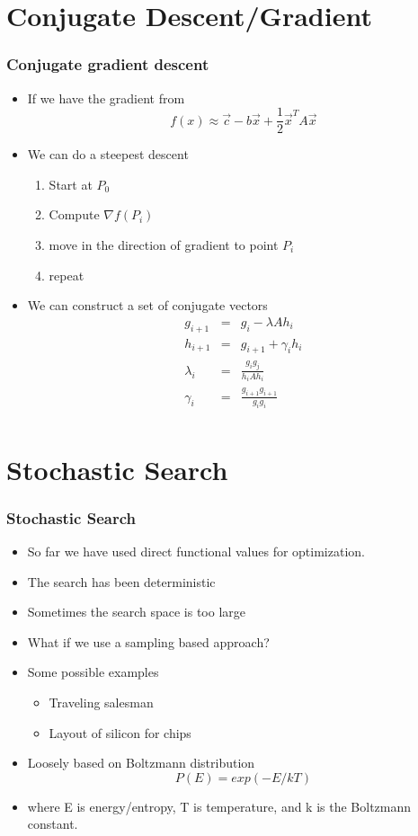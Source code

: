 \documentclass[10pt]{beamer}
\begin{document}
\section{Conjugate Descent/Gradient}
\label{sec:conj-desc}

\begin{frame}
  \frametitle{Conjugate gradient descent}
  \begin{itemize}
  \item If we have the gradient from
    \[
      f(x) \approx \vec{c} - b \vec{x} + \frac{1}{2} \vec{x}^T A \vec{x}
    \]
  \item We can do a steepest descent
    \begin{enumerate}
    \item Start at $P_0$
    \item Compute $\nabla f(P_i)$
    \item move in the direction of gradient to point $P_i$
    \item repeat
    \end{enumerate}
  \item We can construct a set of conjugate vectors
    \[
      \begin{array}{ccc}
        g_{i+1} & = & g_i - \lambda A h_i \\
        h_{i+1} & = & g_{i+1} + \gamma_i h_i\\
        \lambda_i & = & \frac{ g_i g_j }{ h_i A h_i }\\
        \gamma_i &=& \frac{g_{i+1} g_{i+1}}{ g_i g_i }\\
      \end{array}
    \]
  \end{itemize}
\end{frame}

\section{Stochastic Search}
\label{sec:stochastic-search}

\begin{frame}
  \frametitle{Stochastic Search}
  \begin{itemize}
  \item So far we have used direct functional values for optimization. 
  \item The search has been deterministic 
  \item Sometimes the search space is too large
  \item What if we use a sampling based approach?
  \item Some possible examples
    \begin{itemize}
    \item Traveling salesman
    \item Layout of silicon for chips
    \end{itemize}
  \item Loosely based on Boltzmann distribution
    \[
      P(E) = exp(-E/kT)
    \]
  \item where E is energy/entropy, T is temperature, and k is the
    Boltzmann constant.
    
  \end{itemize}
\end{frame}
\end{document}
